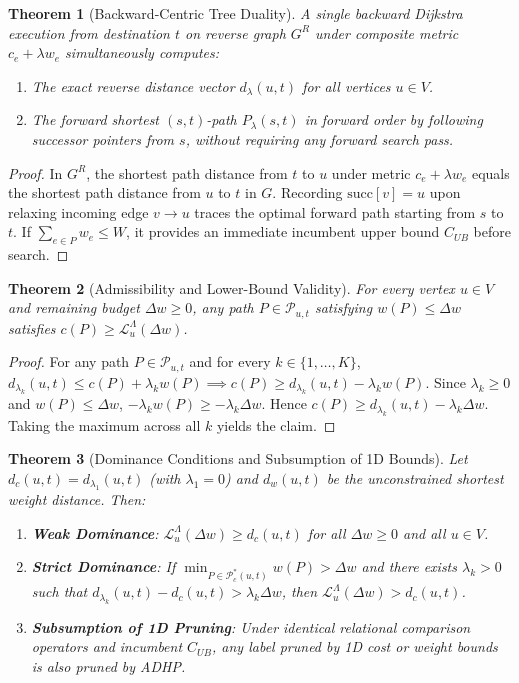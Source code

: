 \documentclass[11pt,a4paper]{article}
\newtheorem{theorem}{Theorem}
\begin{document}
\begin{theorem}[Backward-Centric Tree Duality]
A single backward Dijkstra execution from destination $t$ on reverse graph $G^R$ under composite metric $c_e + \lambda w_e$ simultaneously computes:
\begin{enumerate}
    \item The exact reverse distance vector $d_\lambda(u, t)$ for all vertices $u \in V$.
    \item The forward shortest $(s, t)$-path $P_\lambda(s, t)$ in forward order by following successor pointers from $s$, without requiring any forward search pass.
\end{enumerate}
\end{theorem}
\begin{proof}
In $G^R$, the shortest path distance from $t$ to $u$ under metric $c_e + \lambda w_e$ equals the shortest path distance from $u$ to $t$ in $G$. Recording $\text{succ}[v] = u$ upon relaxing incoming edge $v \to u$ traces the optimal forward path starting from $s$ to $t$. If $\sum_{e \in P} w_e \le W$, it provides an immediate incumbent upper bound $C_{UB}$ before search.
\end{proof}

\begin{theorem}[Admissibility and Lower-Bound Validity]
For every vertex $u \in V$ and remaining budget $\Delta w \ge 0$, any path $P \in \mathcal{P}_{u, t}$ satisfying $w(P) \le \Delta w$ satisfies $c(P) \ge \mathcal{L}_u^\Lambda(\Delta w)$.
\end{theorem}
\begin{proof}
For any path $P \in \mathcal{P}_{u, t}$ and for every $k \in \{1, \dots, K\}$, $d_{\lambda_k}(u, t) \le c(P) + \lambda_k w(P) \implies c(P) \ge d_{\lambda_k}(u, t) - \lambda_k w(P)$. Since $\lambda_k \ge 0$ and $w(P) \le \Delta w$, $-\lambda_k w(P) \ge -\lambda_k \Delta w$. Hence $c(P) \ge d_{\lambda_k}(u, t) - \lambda_k \Delta w$. Taking the maximum across all $k$ yields the claim.
\end{proof}

\begin{theorem}[Dominance Conditions and Subsumption of 1D Bounds]
Let $d_c(u, t) = d_{\lambda_1}(u, t)$ (with $\lambda_1 = 0$) and $d_w(u, t)$ be the unconstrained shortest weight distance. Then:
\begin{enumerate}
    \item \textbf{Weak Dominance}: $\mathcal{L}_u^\Lambda(\Delta w) \ge d_c(u, t)$ for all $\Delta w \ge 0$ and all $u \in V$.
    \item \textbf{Strict Dominance}: If $\min_{P \in \mathcal{P}_c^*(u, t)} w(P) > \Delta w$ and there exists $\lambda_k > 0$ such that $d_{\lambda_k}(u, t) - d_c(u, t) > \lambda_k \Delta w$, then $\mathcal{L}_u^\Lambda(\Delta w) > d_c(u, t)$.
    \item \textbf{Subsumption of 1D Pruning}: Under identical relational comparison operators and incumbent $C_{UB}$, any label pruned by 1D cost or weight bounds is also pruned by ADHP.
\end{enumerate}
\end{theorem}
\end{document}
